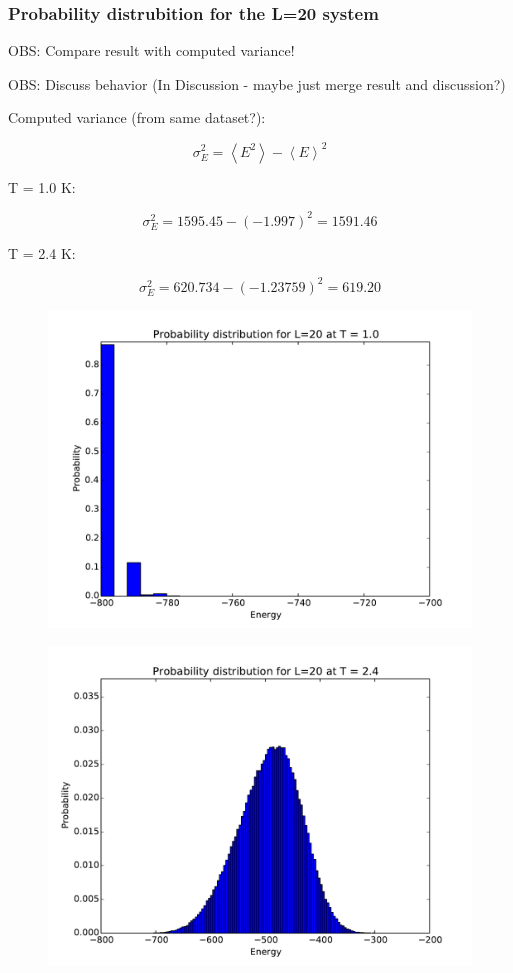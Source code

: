 \subsubsection{Probability distrubition  for the L=20 system}


OBS: Compare result with computed variance!

OBS: Discuss behavior (In Discussion - maybe just merge result and discussion?)

Computed variance (from same dataset?):

$$ \sigma_E^2 = \left< E^2\right> - \left< E\right>^2 $$

T = 1.0 K:

$$ \sigma_E^2 = 1595.45 - (-1.997)^2 = 1591.46$$

T = 2.4 K:

$$ \sigma_E^2 =   620.734 - (-1.23759)^2
= 619.20$$



\begin{figure}[H]
	\centering
	\includegraphics[width=0.7\linewidth]{../results/4d/PD_T_1MC_1e6}
	\caption{}
	\label{fig:pdt1}
\end{figure}

\begin{figure}[H]
	\centering
	\includegraphics[width=0.7\linewidth]{../results/4d/PD_T_2MC_1e6}
	\caption{}
	\label{fig:pdt2_4}
\end{figure}



